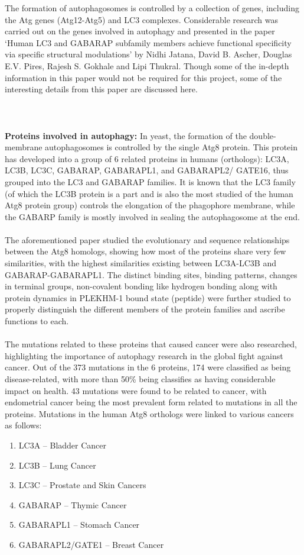\documentclass[12pt, a4paper]{report}
\begin{document}
The formation of autophagosomes is controlled by a collection of genes, including the Atg genes (Atg12-Atg5) and LC3 complexes. Considerable research was carried out on the genes involved in autophagy and presented in the paper ‘Human LC3 and GABARAP subfamily members achieve functional specificity via specific structural modulations’ by Nidhi Jatana, David B. Ascher, Douglas E.V. Pires, Rajesh S. Gokhale and Lipi Thukral. Though some of the in-depth information in this paper would not be required for this project, some of the interesting details from this paper are discussed here. 
\\~\\~\\~\\
\textbf{Proteins involved in autophagy:} In yeast, the formation of the double-membrane autophagosomes is controlled by the single Atg8 protein. This protein has developed into a group of 6 related proteins in humans (orthologs): LC3A, LC3B, LC3C, GABARAP, GABARAPL1, and GABARAPL2/ GATE16, thus grouped into the LC3 and GABARAP families. It is known that the LC3 family (of which the LC3B protein is a part and is also the most studied of the human Atg8 protein group) controls the elongation of the phagophore membrane, while the GABARP family is mostly involved in sealing the autophagosome at the end. 
\\~\\
The aforementioned paper studied the evolutionary and sequence relationships between the Atg8 homologs, showing how most of the proteins share very few similarities, with the highest similarities existing between LC3A-LC3B and GABARAP-GABARAPL1. The distinct binding sites, binding patterns, changes in terminal groups, non-covalent bonding like hydrogen bonding along with protein dynamics in PLEKHM-1 bound state (peptide) were further studied to properly distinguish the different members of the protein families and ascribe functions to each. 
\\~\\
The mutations related to these proteins that caused cancer were also researched, highlighting the importance of autophagy research in the global fight against cancer. Out of the 373 mutations in the 6 proteins, 174 were classified as being disease-related, with more than 50\% being classifies as having considerable impact on health. 43 mutations were found to be related to cancer, with endometrial cancer being the most prevalent form related to mutations in all the proteins. Mutations in the human Atg8 orthologs were linked to various cancers as follows: 
\begin{enumerate} 
\item LC3A – Bladder Cancer 
\item LC3B – Lung Cancer 
\item LC3C – Prostate and Skin Cancers 
\item GABARAP – Thymic Cancer 
\item GABARAPL1 – Stomach Cancer 
\item GABARAPL2/GATE1 – Breast Cancer 
\end{enumerate} 
\end{document}
